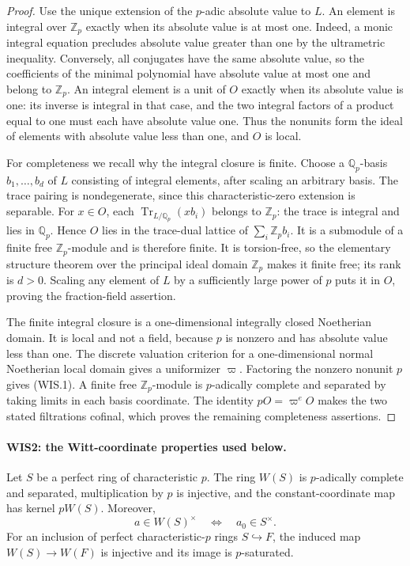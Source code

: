 \begin{proof}
Use the unique extension of the $p$-adic absolute value to $L$.
An element is integral over $\mathbb Z_p$ exactly when its absolute
value is at most one. Indeed, a monic integral equation precludes
absolute value greater than one by the ultrametric inequality.
Conversely, all conjugates have the same absolute value, so the
coefficients of the minimal polynomial have absolute value at most
one and belong to $\mathbb Z_p$. An integral element is a unit of
$O$ exactly when its absolute value is one: its inverse is integral
in that case, and the two integral factors of a product equal to
one must each have absolute value one. Thus the nonunits form
the ideal of elements with absolute value less than one, and $O$
is local.

For completeness we recall why the integral closure is finite.
Choose a $\mathbb Q_p$-basis $b_1,\ldots,b_d$ of $L$ consisting of
integral elements, after scaling an arbitrary basis. The trace
pairing is nondegenerate, since this characteristic-zero extension
is separable. For $x\in O$, each $\operatorname{Tr}_{L/\mathbb Q_p}
(xb_i)$ belongs to $\mathbb Z_p$: the trace is integral and lies
in $\mathbb Q_p$. Hence $O$ lies in the trace-dual lattice of
$\sum_i\mathbb Z_p b_i$. It is a submodule of a finite free
$\mathbb Z_p$-module and is therefore finite. It is torsion-free,
so the elementary structure theorem over the principal ideal
domain $\mathbb Z_p$ makes it finite free; its rank is $d>0$.
Scaling any element of $L$ by a sufficiently large power of $p$
puts it in $O$, proving the fraction-field assertion.

The finite integral closure is a one-dimensional integrally closed
Noetherian domain. It is local and not a field, because $p$ is
nonzero and has absolute value less than one. The discrete
valuation criterion for a one-dimensional normal Noetherian local
domain gives a uniformizer $\varpi$. Factoring the nonzero nonunit
$p$ gives (WIS.1). A finite free $\mathbb Z_p$-module is $p$-adically
complete and separated by taking limits in each basis coordinate.
The identity $pO=\varpi^eO$ makes the two stated filtrations cofinal,
which proves the remaining completeness assertions.
\end{proof}

\paragraph{WIS2: the Witt-coordinate properties used below.}
\label{claim:WIS2}
Let $S$ be a perfect ring of characteristic $p$. The ring $W(S)$
is $p$-adically complete and separated, multiplication by $p$ is
injective, and the constant-coordinate map has kernel $pW(S)$.
Moreover,
\[
       a\in W(S)^\times\quad\Longleftrightarrow\quad
                         a_0\in S^\times.                 \tag{WIS.2}
\]
For an inclusion of perfect characteristic-$p$ rings $S\hookrightarrow F$,
the induced map $W(S)\to W(F)$ is injective and its image is
$p$-saturated.

